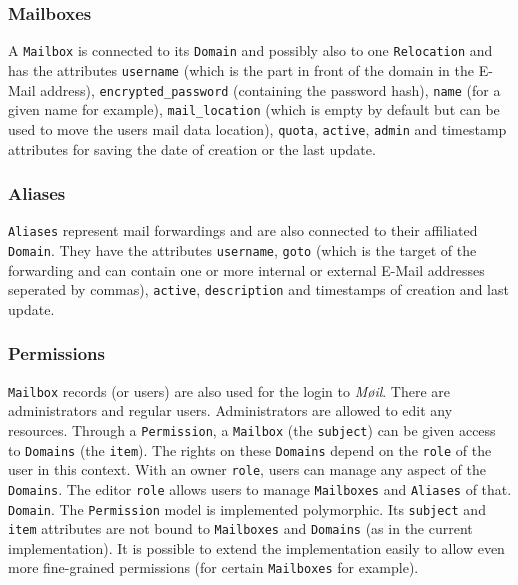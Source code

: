 \documentclass[12pt,a4paper]{scrartcl}
\begin{document}
			\subsubsection{Mailboxes}
				A \texttt{Mailbox} is connected to its \texttt{Domain} and
				possibly also to one \texttt{Relocation} and has the attributes
				\texttt{username} (which is the part in front of the
				domain in the E-Mail address), \texttt{encrypted\_password}
				(containing the password hash), \texttt{name} (for a given name
				for example), \texttt{mail\_location} (which is empty by
				default but can be used to move the users mail data location),
				\texttt{quota}, \texttt{active}, \texttt{admin} and timestamp
				attributes for saving the date of creation or the last update.

			\subsubsection{Aliases}
				\texttt{Aliases} represent mail forwardings and are also
				connected to their affiliated \texttt{Domain}. They have the
				attributes \texttt{username}, \texttt{goto} (which is the
				target of the forwarding and can contain one or more internal
				or external E-Mail addresses seperated by commas),
				\texttt{active}, \texttt{description} and timestamps of
				creation and last update.

			\subsubsection{Permissions}
				\texttt{Mailbox} records (or users) are also used for the login
				to \emph{Møil}. There are administrators and regular users.
				Administrators are allowed to edit any resources. Through a
				\texttt{Permission}, a \texttt{Mailbox} (the \texttt{subject})
				can be given access to \texttt{Domains} (the \texttt{item}).
				The rights on these \texttt{Domains} depend on the
				\texttt{role} of the user in this context. With an owner
				\texttt{role}, users can manage any aspect of the
				\texttt{Domains}. The editor \texttt{role} allows users to
				manage \texttt{Mailboxes} and \texttt{Aliases} of that.
				\texttt{Domain}. The \texttt{Permission} model is implemented
				polymorphic. Its \texttt{subject} and \texttt{item} attributes
				are not bound to \texttt{Mailboxes} and \texttt{Domains} (as in
				the current implementation). It is possible to extend the
				implementation easily to allow even more fine-grained
				permissions (for certain \texttt{Mailboxes} for example).
\end{document}
